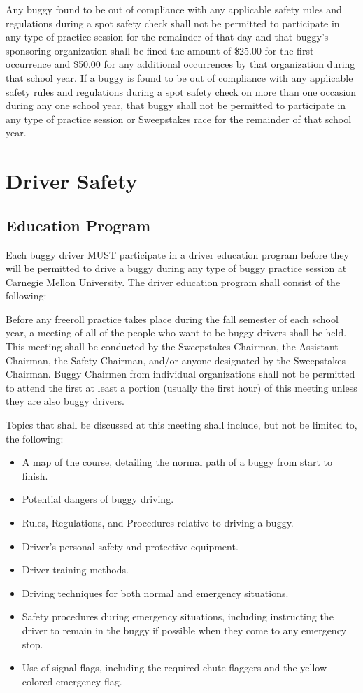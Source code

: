 	Any buggy found to be out of compliance with any applicable safety rules and
	regulations during a spot safety check shall not be permitted to participate in
	any type of practice session for the remainder of that day and that buggy's
	sponsoring organization shall be fined the amount of \$25.00 for the first
	occurrence and \$50.00 for any additional occurrences by that organization
	during that school year. If a buggy is found to be out of compliance with any
	applicable safety rules and regulations during a spot safety check on more than
	one occasion during any one school year, that buggy shall not be permitted to
	participate in any type of practice session or Sweepstakes race for the
	remainder of that school year.

\section{Driver Safety}

\subsection{Education Program}

	Each buggy driver MUST participate in a driver education program before they
	will be permitted to drive a buggy during any type of buggy practice session at
	Carnegie Mellon University. The driver education program shall consist of the
	following:
	\newline

	Before any freeroll practice takes place during the fall semester of each
	school year, a meeting of all of the people who want to be buggy drivers shall
	be held. This meeting shall be conducted by the Sweepstakes Chairman, the
	Assistant Chairman, the Safety Chairman, and/or anyone designated by the
	Sweepstakes Chairman. Buggy Chairmen from individual organizations shall not be
	permitted to attend the first at least a portion (usually the first hour) of
	this meeting unless they are also buggy drivers.

	Topics that shall be discussed at this meeting shall include, but not be
	limited to, the following:

	\begin{itemize}
		\item A map of the course, detailing the normal path of a buggy from start to finish.
		\item Potential dangers of buggy driving.
		\item Rules, Regulations, and Procedures relative to driving a buggy.
		\item Driver's personal safety and protective equipment.
		\item Driver training methods.
		\item Driving techniques for both normal and emergency situations.
		\item Safety procedures during emergency situations, including instructing the driver to remain in the buggy if possible when they come to any emergency stop.
		\item Use of signal flags, including the required chute flaggers and the yellow colored emergency flag. 
	\end{itemize}

